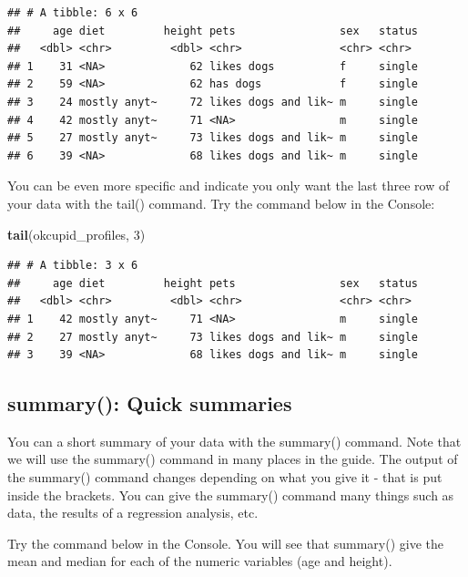 \documentclass[
]{krantz}
\makeatletter
\newenvironment{Shaded}{\begin{snugshade}}{\end{snugshade}}
\newcommand{\DecValTok}[1]{\textcolor[rgb]{0.06,0.06,0.06}{#1}}
\newcommand{\KeywordTok}[1]{\textcolor[rgb]{0.27,0.27,0.27}{\textbf{#1}}}
\newcommand{\NormalTok}[1]{#1}
\newenvironment{kframe}{%
\medskip{}
\setlength{\fboxsep}{.8em}
 \def\at@end@of@kframe{}%
 \ifinner\ifhmode%
  \def\at@end@of@kframe{\end{minipage}}%
  \begin{minipage}{\columnwidth}%
 \fi\fi%
 \def\FrameCommand##1{\hskip\@totalleftmargin \hskip-\fboxsep
 \colorbox{shadecolor}{##1}\hskip-\fboxsep
     \hskip-\linewidth \hskip-\@totalleftmargin \hskip\columnwidth}%
 \MakeFramed {\advance\hsize-\width
   \@totalleftmargin\z@ \linewidth\hsize
   \@setminipage}}%
 {\par\unskip\endMakeFramed%
 \at@end@of@kframe}
\renewenvironment{Shaded}{\begin{kframe}}{\end{kframe}}
\makeatother
\begin{document}
\begin{verbatim}
## # A tibble: 6 x 6
##     age diet         height pets                sex   status
##   <dbl> <chr>         <dbl> <chr>               <chr> <chr> 
## 1    31 <NA>             62 likes dogs          f     single
## 2    59 <NA>             62 has dogs            f     single
## 3    24 mostly anyt~     72 likes dogs and lik~ m     single
## 4    42 mostly anyt~     71 <NA>                m     single
## 5    27 mostly anyt~     73 likes dogs and lik~ m     single
## 6    39 <NA>             68 likes dogs and lik~ m     single
\end{verbatim}

You can be even more specific and indicate you only want the last three row of your data with the tail() command. Try the command below in the Console:

\begin{Shaded}
\begin{Highlighting}[]
\KeywordTok{tail}\NormalTok{(okcupid_profiles, }\DecValTok{3}\NormalTok{)}
\end{Highlighting}
\end{Shaded}

\begin{verbatim}
## # A tibble: 3 x 6
##     age diet         height pets                sex   status
##   <dbl> <chr>         <dbl> <chr>               <chr> <chr> 
## 1    42 mostly anyt~     71 <NA>                m     single
## 2    27 mostly anyt~     73 likes dogs and lik~ m     single
## 3    39 <NA>             68 likes dogs and lik~ m     single
\end{verbatim}

\hypertarget{summary-quick-summaries}{%
\subsection{summary(): Quick summaries}\label{summary-quick-summaries}}

You can a short summary of your data with the summary() command. Note that we will use the summary() command in many places in the guide. The output of the summary() command changes depending on what you give it - that is put inside the brackets. You can give the summary() command many things such as data, the results of a regression analysis, etc.

Try the command below in the Console. You will see that summary() give the mean and median for each of the numeric variables (age and height).
\end{document}
